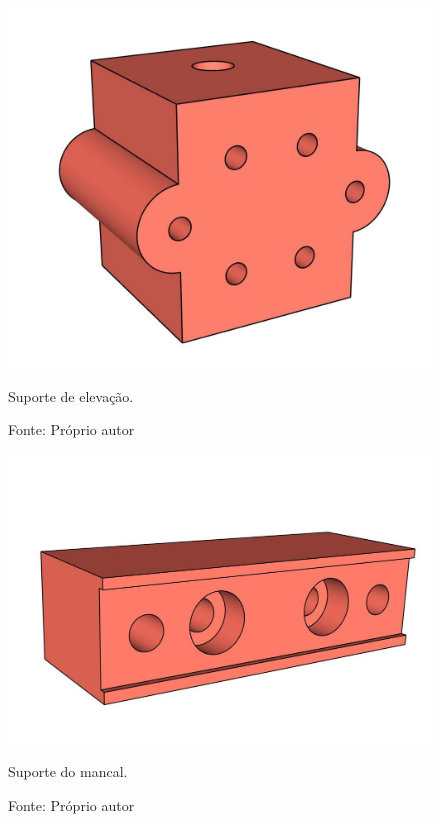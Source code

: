 \begin{figure}[H]
\centering
\includegraphics[scale = 0.4]{figuras/ressuporteelevacao}
\caption{Suporte de elevação.}
\caption*{Fonte: Próprio autor}
\label{fig:ressuporteelevacao}
\end{figure}

\begin{figure}[H]
\centering
\includegraphics[scale = 0.4]{figuras/ressuportemancal}
\caption{Suporte do mancal.}
\caption*{Fonte: Próprio autor}
\label{fig:ressuportemancal}
\end{figure}

